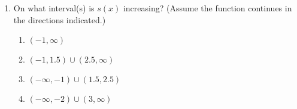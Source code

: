 \documentclass{article}
\begin{document}
\begin{enumerate}
\begin{enumerate}
    \end{enumerate}
    

\item On what interval(s) is $s(x)$ increasing? (Assume the function continues in the directions indicated.)
 
 
  \begin{enumerate}
   \item $(-1, \infty)$
  \item $(-1,1.5) \cup (2.5,\infty)$ %
  \item $(-\infty,-1) \cup (1.5,2.5)$ %
  \item $(-\infty, -2) \cup (3,\infty)$ %
   
    \end{enumerate}
 



\end{enumerate}
\end{document}
